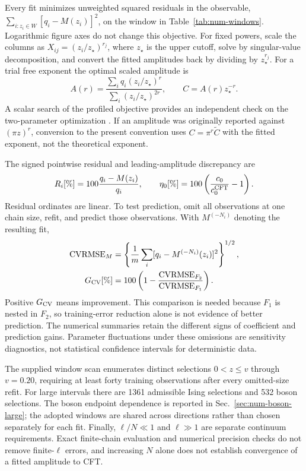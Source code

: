 Every fit minimizes unweighted squared residuals in the
observable, $\sum_{i:z_i\in W}[q_i-M(z_i)]^2$, on the window
in Table~\ref{tab:num-windows}. Logarithmic figure axes do not
change this objective. For fixed powers, scale the columns as
$X_{ij}=(z_i/z_\star)^{r_j}$, where $z_\star$ is the upper
cutoff, solve by singular-value decomposition, and convert
the fitted amplitudes back by dividing by $z_\star^{r_j}$.
For a trial free exponent the optimal scaled amplitude is
\begin{equation}
 A(r)=\frac{\sum_i q_i(z_i/z_\star)^r}
                  {\sum_i(z_i/z_\star)^{2r}},\qquad C=A(r)z_\star^{-r}.
 \label{eq:num-profile}
\end{equation}
A scalar search of the profiled objective provides an
independent check on the two-parameter optimization
\cite{numGolubPereyra}. If an amplitude was originally reported
against $(\pi z)^r$, conversion to the present convention uses
$C=\pi^r\widetilde C$ with the fitted exponent, not the
theoretical exponent.

The signed pointwise residual and leading-amplitude discrepancy are
\begin{equation}
 R_i[\%]=100\frac{q_i-M(z_i)}{q_i},\qquad
 \eta_0[\%]=100\left(\frac{c_0}{c_0^{\rm CFT}}-1\right).
 \label{eq:num-residuals}
\end{equation}
Residual ordinates are linear. To test prediction, omit all
observations at one chain size, refit, and predict those
observations. With $M^{(-N_i)}$ denoting the resulting fit,
\begin{align}
 {\rm CVRMSE}_M&=\left\{\frac1m\sum_i
 [q_i-M^{(-N_i)}(z_i)]^2\right\}^{1/2},\nonumber\\
 G_{\rm CV}[\%]&=100\left(1-
          \frac{{\rm CVRMSE}_{F_2}}{{\rm CVRMSE}_{F_1}}\right).
 \label{eq:num-cv}
\end{align}
Positive $G_{\rm CV}$ means improvement. This comparison is
needed because $F_1$ is nested in $F_2$, so training-error
reduction alone is not evidence of better prediction.
The numerical summaries retain the different signs of
coefficient and prediction gains. Parameter fluctuations
under these omissions are sensitivity diagnostics, not
statistical confidence intervals for deterministic data.

The supplied window scan enumerates distinct selections
$0<z\leq v$ through $v=0.20$, requiring at least forty
training observations after every omitted-size refit. For
large intervals there are 1361 admissible Ising selections
and 532 boson selections. The boson endpoint dependence is
reported in Sec.~\ref{sec:num-boson-large}; the adopted
windows are shared across directions rather than chosen
separately for each fit. Finally, $\ell/N\ll1$ and
$\ell\gg1$ are separate continuum requirements. Exact
finite-chain evaluation and numerical precision checks do
not remove finite-$\ell$ errors, and increasing $N$ alone
does not establish convergence of a fitted amplitude to CFT.
